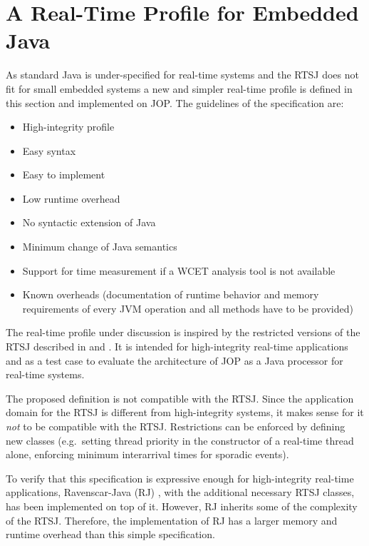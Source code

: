 
\section{A Real-Time Profile for Embedded Java}
\label{sec:rtprof}

As standard Java is under-specified for real-time systems and the
RTSJ does not fit for small embedded systems a new and simpler
real-time profile is defined in this section and implemented on JOP.
The guidelines of the specification are:

\begin{itemize}
\item High-integrity profile
\item Easy syntax
\item Easy to implement
\item Low runtime overhead
\item No syntactic extension of Java
\item Minimum change of Java semantics
\item Support for time measurement if a WCET analysis tool is not available
\item Known overheads (documentation of runtime behavior and memory
requirements of every JVM operation and all methods have to be
provided)
\end{itemize}

The real-time profile under discussion is inspired by the restricted
versions of the RTSJ described in \cite{Pusch01} and
\cite{ravenscar:java}. It is intended for high-integrity real-time
applications and as a test case to evaluate the architecture of JOP
as a Java processor for real-time systems.

The proposed definition is not compatible with the RTSJ. Since the
application domain for the RTSJ is different from high-integrity
systems, it makes sense for it \emph{not} to be compatible with the
RTSJ. Restrictions can be enforced by defining new classes (e.g.\
setting thread priority in the constructor of a real-time thread
alone, enforcing minimum interarrival times for sporadic events).

To verify that this specification is expressive enough for
high-integrity real-time applications, Ravenscar-Java (RJ)
\cite{ravenscar:java}, with the additional necessary RTSJ classes,
has been implemented on top of it. However, RJ inherits some of the
complexity of the RTSJ. Therefore, the implementation of RJ has a
larger memory and runtime overhead than this simple specification.

